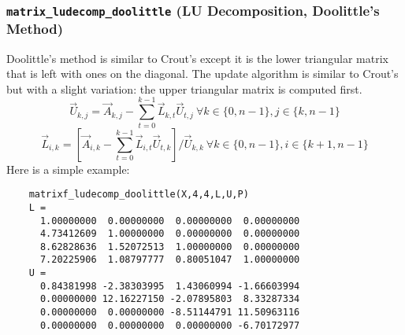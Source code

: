 \subsubsection{{\tt matrix\_ludecomp\_doolittle} (LU Decomposition, Doolittle's Method)}
\label{module:matrix:ludecomp_doolittle}
Doolittle's method is similar to Crout's except it is the lower triangular
matrix that is left with ones on the diagonal.
The update algorithm is similar to Crout's but with a slight variation: the
upper triangular matrix is computed first.
%
\[
    \vec{U}_{k,j} = \vec{A}_{k,j} -
                    \sum_{t=0}^{k-1}{ \vec{L}_{k,t} \vec{U}_{t,j} }
                    \ \forall k \in \{0,n-1\}, j \in \{k,n-1\}
\]
%
\[
    \vec{L}_{i,k} = \left[
                        \vec{A}_{i,k} -
                        \sum_{t=0}^{k-1}{ \vec{L}_{i,t} \vec{U}_{t,k} }
                    \right] / \vec{U}_{k,k}
                    \ \forall k \in \{0,n-1\}, i \in \{k+1,n-1\}
\]
%
Here is a simple example:
\begin{verbatim}
    matrixf_ludecomp_doolittle(X,4,4,L,U,P)
    L =
      1.00000000  0.00000000  0.00000000  0.00000000
      4.73412609  1.00000000  0.00000000  0.00000000
      8.62828636  1.52072513  1.00000000  0.00000000
      7.20225906  1.08797777  0.80051047  1.00000000
    U =
      0.84381998 -2.38303995  1.43060994 -1.66603994
      0.00000000 12.16227150 -2.07895803  8.33287334
      0.00000000  0.00000000 -8.51144791 11.50963116
      0.00000000  0.00000000  0.00000000 -6.70172977
\end{verbatim}

